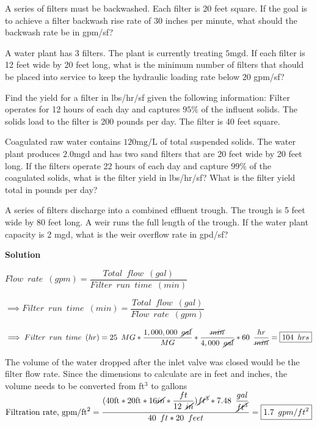   A series of filters must be backwashed. Each filter is 20 feet square. If the goal is to achieve a filter backwash rise rate of 30 inches per minute, what should the backwash rate be in gpm/sf?

  A water plant has 3 filters. The plant is currently treating $5 \mathrm{mgd}$. If each filter is 12 feet wide by 20 feet long, what is the minimum number of filters that should be placed into service to keep the hydraulic loading rate below 20 gpm/sf?

  Find the yield for a filter in lbs/hr/sf given the following information: Filter operates for 12 hours of each day and captures $95 \%$ of the influent solids. The solids load to the filter is 200 pounds per day. The filter is 40 feet square.

  Coagulated raw water contains $120 \mathrm{mg} / \mathrm{L}$ of total suspended solids. The water plant produces $2.0 \mathrm{mgd}$ and has two sand filters that are 20 feet wide by 20 feet long. If the filters operate 22 hours of each day and capture $99 \%$ of the coagulated solids, what is the filter yield in lbs/hr/sf? What is the filter yield total in pounds per day?

  A series of filters discharge into a combined effluent trough. The trough is 5 feet wide by 80 feet long. A weir runs the full length of the trough. If the water plant capacity is 2 mgd, what is the weir overflow rate in gpd/sf?



\textbf{Solution}


$Flow \enspace rate \enspace (gpm)=\dfrac{Total \enspace flow \enspace (gal)}{Filter \enspace run \enspace time \enspace (min)}$

\vspace{0.3cm}

$\implies Filter \enspace run \enspace time \enspace (min)=\dfrac{Total \enspace flow \enspace (gal)}{Flow \enspace rate \enspace (gpm)}$\\

\vspace{0.3cm}

$\implies Filter \enspace run \enspace time \enspace (hr)=25 \enspace MG*\dfrac{1,000,000 \enspace \cancel{gal}}{MG}*\dfrac{\cancel{min}}{4,000 \enspace \cancel{gal}}*60 \enspace \dfrac{hr}{\cancel{min}}=\boxed{104 \enspace hrs}$

The volume of the water dropped after the inlet valve was closed would be the filter flow rate.  Since the dimensions to calculate are in feet and inches, the volume needs to be converted from ft$^3$ to gallons\\
\vspace{0.2cm}
$\text{Filtration rate, } \mathrm{gpm} / \mathrm{ft}^{2} = 
\dfrac{(
40 \mathrm{ ft}*20 \mathrm{ ft} * 16 \mathrm{\cancel{in}}*
\dfrac{ft}{12 \enspace \cancel{in}}
)
\cancel{ft^3}*7.48 \enspace 
\dfrac
{gal}
{\cancel{ft^3}}}
{40 \enspace ft * 20 \enspace feet}= \boxed{1.7\enspace gpm/ft^2}$\\

